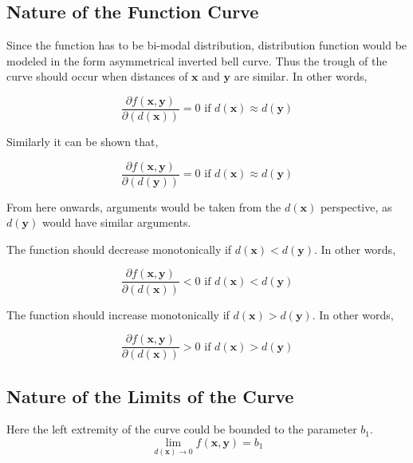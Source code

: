 \subsection{Nature of the Function Curve}




Since the function has to be bi-modal distribution, distribution function would be modeled in the form asymmetrical inverted bell curve. Thus the trough of the curve should occur when distances of $\mathbf{x}$ and $\mathbf{y}$ are similar. In other words,

\begin{equation} \label{c1}
\frac{\partial f(\mathbf{x}, \mathbf{y})}{\partial ( d(\mathbf{x}) )} = 0 \text{ if } d(\mathbf{x}) \approx d(\mathbf{y})
\end{equation}

Similarly it can be shown that,

\begin{equation*}
\frac{\partial f(\mathbf{x}, \mathbf{y})}{\partial (d(\mathbf{y}))} = 0 \text{ if } d(\mathbf{x}) \approx d(\mathbf{y})
\end{equation*}

From here onwards, arguments would be taken from the $d(\mathbf{x})$ perspective, as $d(\mathbf{y})$ would have similar arguments.

The function should decrease monotonically if $d(\mathbf{x}) < d(\mathbf{y})$. In other words, 

\begin{equation} \label{c2}
\frac{\partial f(\mathbf{x}, \mathbf{y})}{\partial ( d(\mathbf{x}) )} < 0 \text{ if } d(\mathbf{x}) < d(\mathbf{y})
\end{equation}

The function should increase monotonically if $d(\mathbf{x}) > d(\mathbf{y})$. In other words,

\begin{equation} \label{c3}
\frac{\partial f(\mathbf{x}, \mathbf{y})}{\partial ( d(\mathbf{x}) )} > 0 \text{ if } d(\mathbf{x}) > d(\mathbf{y})
\end{equation}

\subsection{Nature of the Limits of the Curve}

Here the left extremity of the curve could be bounded to the parameter $b_1$.
\begin{equation} \label{c4}
\lim_{d(\mathbf{x})\to 0} f(\mathbf{x}, \mathbf{y}) = b_1
\end{equation}

